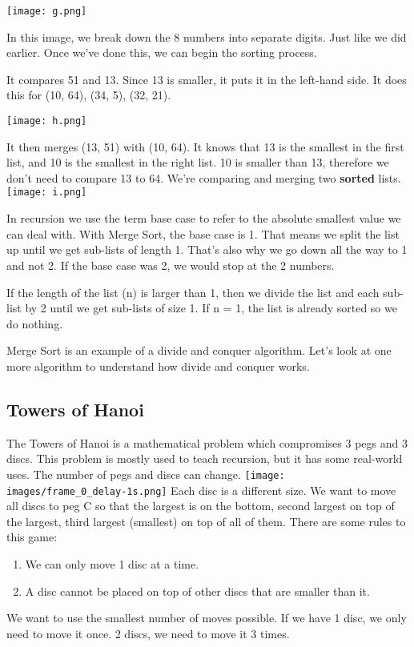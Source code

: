 \documentclass{article}
\begin{document}
\texttt{[image: g.png]}

In this image, we break down the 8 numbers into separate digits. Just like we did earlier. Once we've done this, we can begin the sorting process.

It compares 51 and 13. Since 13 is smaller, it puts it in the left-hand side. It does this for (10, 64), (34, 5), (32, 21).

\texttt{[image: h.png]}

It then merges (13, 51) with (10, 64). It knows that 13 is the smallest in the first list, and 10 is the smallest in the right list. 10 is smaller than 13, therefore we don't need to compare 13 to 64. We're comparing and merging two \textbf{sorted} lists.
\texttt{[image: i.png]}

In recursion we use the term base case to refer to the absolute smallest value we can deal with. With Merge Sort, the base case is 1. That means we split the list up until we get sub-lists of length 1. That's also why we go down all the way to 1 and not 2. If the base case was 2, we would stop at the 2 numbers.

If the length of the list (n) is larger than 1, then we divide the list and each sub-list by 2 until we get sub-lists of size 1. If n = 1, the list is already sorted so we do nothing.

Merge Sort is an example of a divide and conquer algorithm. Let's look at one more algorithm to understand how divide and conquer works.
\newpage
\subsection{Towers of Hanoi}
The Towers of Hanoi is a mathematical problem which compromises 3 pegs and 3 discs. This problem is mostly used to teach recursion, but it has some real-world uses. The number of pegs and discs can change.
\texttt{[image: images/frame\_0\_delay-1s.png]}
Each disc is a different size. We want to move all discs to peg C so that the largest is on the bottom, second largest on top of the largest, third largest (smallest) on top of all of them. There are some rules to this game:
\begin{enumerate}
    \item We can only move 1 disc at a time.
    \item A disc cannot be placed on top of other discs that are smaller than it.
\end{enumerate}
We want to use the smallest number of moves possible. If we have 1 disc, we only need to move it once. 2 discs, we need to move it 3 times.
\end{document}
